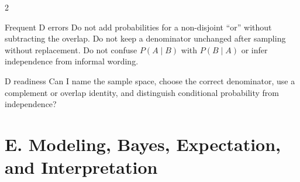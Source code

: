 \documentclass[10pt]{article}
\begin{document}
\begin{multicols}{2}
\begin{warningbox}{Frequent D errors}
Do not add probabilities for a non-disjoint ``or'' without subtracting the
overlap. Do not keep a denominator unchanged after sampling without
replacement. Do not confuse $P(A\mid B)$ with $P(B\mid A)$ or infer
independence from informal wording.
\end{warningbox}

\begin{checklistbox}{D readiness}
Can I name the sample space, choose the correct denominator, use a complement
or overlap identity, and distinguish conditional probability from
independence?
\end{checklistbox}
\end{multicols}

\section*{E. Modeling, Bayes, Expectation, and Interpretation}
\end{document}
